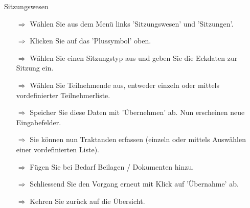 \documentclass[twocolumn]{article}
\begin{document}




\noindent  %





\begin{beamerlikethm}{Sitzungswesen}
\begin{itemize}
  \item[$\Longrightarrow$] Wählen Sie aus dem Menü links 'Sitzungswesen' und 'Sitzungen'.
  \item[$\Longrightarrow$] Klicken Sie auf das 'Plussymbol' oben.
  \item[$\Longrightarrow$] Wählen Sie einen Sitzungstyp aus und geben Sie die Eckdaten zur Sitzung ein.
	\item[$\Longrightarrow$] Wählen Sie Teilnehmende aus, entweder einzeln oder mittels vordefinierter Teilnehmerliste.
  \item[$\Longrightarrow$] Speicher Sie diese Daten mit 'Übernehmen' ab. Nun erscheinen neue Eingabefelder.
  \item[$\Longrightarrow$] Sie können nun Traktanden erfassen (einzeln oder mittels Auswählen einer vordefinierten Liste).
  \item[$\Longrightarrow$] Fügen Sie bei Bedarf Beilagen / Dokumenten hinzu.
  \item[$\Longrightarrow$] Schliessend Sie den Vorgang erneut mit Klick auf 'Übernahme' ab.
  \item[$\Longrightarrow$] Kehren Sie zurück auf die Übersicht.
\end{itemize}
\end{beamerlikethm}
\end{document}
